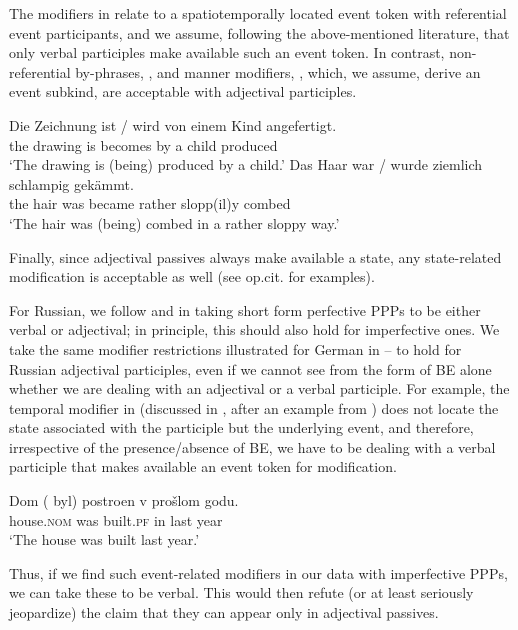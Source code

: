 \documentclass[output=paper,
modfonts,
newtxmath,
hidelinks
]{langscibook}
\begin{document}
\noindent The modifiers in  relate to a spatiotemporally located event token with referential event participants, and we assume, following the above-mentioned literature, that only verbal participles make available such an event token. In contrast, non-referential by-phrases, , and manner modifiers, , which, we assume,  derive an event subkind, are acceptable with adjectival participles. 

\ea\label{acc}
\ea\gll	Die Zeichnung ist / wird von einem Kind angefertigt.\label{zeichnung}\\
	the drawing is {} becomes by a child produced \\
\glt	`The drawing is (being) produced by a child.'
\ex\gll	Das Haar war / wurde ziemlich schlampig gek\"{a}mmt.\label{schlampig}\\
	the hair was {} became rather slopp(il)y combed\\
\glt	`The hair was (being) combed in a rather sloppy way.'
\z\z

\noindent Finally, since adjectival passives always make available a state, any state-related modification is acceptable as well (see op.cit. for examples).

For Russian, we follow \citet{schoorlemmer95} and \citet{borik13, borik14} in  taking short form perfective PPPs to be either verbal or adjectival; in principle, this should also hold for imperfective ones. We take the same modifier restrictions illustrated for German in -- to hold for Russian adjectival participles, even if we cannot see from the form of BE alone whether we are dealing with an adjectival or a verbal participle. For example, the temporal modifier in  (discussed in \citealt{borik14}, after an example from \citealt{paslawskastechow}) does not locate the state associated with the participle but the underlying event, and therefore, irrespective of the presence/absence of BE, we have to be dealing with a verbal participle that makes available an event token for modification.

\ea\gll	Dom (\hspace{-2pt} byl) postroen v prošlom godu.\\
	house.\textsc{nom} {} was built.\textsc{pf} in last year\\
\glt `The house was built last year.'\label{dom}
\z
	
\noindent Thus, if we find such event-related modifiers in our data with imperfective PPPs, we can take these to be verbal. This would then refute (or at least seriously jeopardize) the claim that they can appear only in adjectival passives. 
\end{document}
